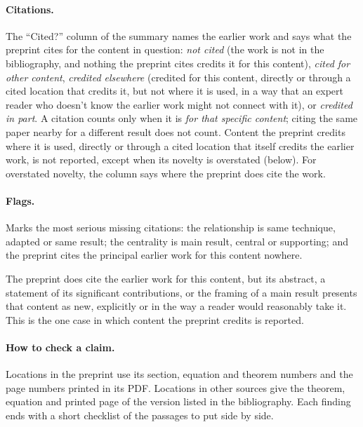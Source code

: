 \documentclass[11pt]{article}
\newcounter{finding}
\begin{document}
\paragraph{Citations.}
The ``Cited?'' column of the summary names the earlier work and says what the
preprint cites for the content in question: \emph{not cited} (the work is not
in the bibliography, and nothing the preprint cites credits it for this
content), \emph{cited for other content}, \emph{credited elsewhere} (credited
for this content, directly or through a cited location that credits it, but
not where it is used, in a way that an expert reader who doesn't know the earlier work might not connect with it), or \emph{credited in part}. A citation counts only when it is \emph{for that specific content};
citing the same paper nearby for a different result does not count. Content
the preprint credits where it is used, directly or through a cited location
that itself credits the earlier work, is not reported, except when its novelty is overstated (below). For
overstated novelty, the column says where the preprint does cite the work.

\paragraph{Flags.}
\begin{description}[leftmargin=1.5em,font=\normalfont\bfseries]
\item[Attribution gap.] Marks the most serious missing citations: the
relationship is same technique, adapted or same result; the centrality is main
result, central or supporting; and the preprint cites the principal earlier
work for this content nowhere.
\item[Overstated novelty.] The preprint does cite the earlier work for this
content, but its abstract, a statement of its significant contributions, or the framing of
a main result presents that content as new, explicitly or in the way a reader
would reasonably take it. This is the one case in which content the preprint
credits is reported.
\end{description}

\paragraph{How to check a claim.}
Locations in the preprint use its section,
equation and theorem numbers and the page numbers printed in its PDF.
Locations in other sources give the theorem, equation and printed page of the
version listed in the bibliography. Each finding ends with a short checklist
of the passages to put side by side.
\end{document}
